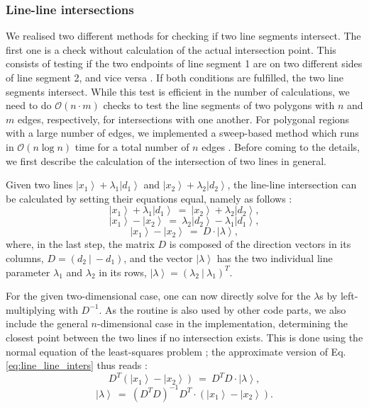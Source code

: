 \subsubsection*{Line-line intersections}
We realised two different methods for checking if two line segments intersect.
The first one is a check without calculation of the actual intersection point. 
This consists of testing if the two endpoints of line segment 1 are on two different sides of line
segment 2, and vice versa \cite{TODO}. If both conditions are fulfilled, the two line segments intersect.
While this test is efficient in the number of calculations, we need to do $\mathcal{O}\left(n \cdot m\right)$ checks
to test the line segments of two polygons with $n$ and $m$ edges, respectively, for intersections with one another.
For polygonal regions with a large number of edges, we implemented a sweep-based method which runs
in $\mathcal{O}\left(n \log n\right)$ time for a total number of $n$ edges \cite{TODO}. 
Before coming to the details, we first describe the calculation of the intersection of two lines in general.

Given two lines $\left|x_1\right> + \lambda_1 \left|d_1\right>$ and $\left|x_2\right> + \lambda_2 \left|d_2\right>$, 
the line-line intersection can be calculated by setting their equations equal, namely as follows \cite{wiki_line_line_intersection}:
\begin{equation}
	\left|x_1\right> + \lambda_1 \left|d_1\right> \ =\ \left|x_2\right> + \lambda_2 \left|d_2\right>,
\end{equation}
\begin{equation}
	\left|x_1\right> - \left|x_2\right> \ =\  \lambda_2 \left|d_2\right> - \lambda_1 \left|d_1\right>,
\end{equation}
\begin{equation}
	\left|x_1\right> - \left|x_2\right> \ =\  D \cdot \left| \lambda \right>,
	\label{eq:line_line_inters}
\end{equation}
where, in the last step, the matrix $D$ is composed of the direction vectors in its columns, $D = \left( d_2 \ |\  -d_1 \right)$, 
and the vector $\left| \lambda \right>$ has the two individual line parameter $\lambda_1$ and $\lambda_2$ in its
rows, $\left| \lambda \right> = \left( \lambda_2 \ |\  \lambda_1 \right)^T$.

For the given two-dimensional case, one can now directly solve for the $\lambda$s by left-multiplying with $D^{-1}$.
As the routine is also used by other code parts, we also include the general $n$-dimensional case in the implementation, 
determining the closest point between the two lines if no intersection exists.
This is done using the normal equation of the least-squares problem \cite[p. 793]{Arens2015}; 
the approximate version of Eq. \ref{eq:line_line_inters} thus reads \cite{wiki_line_line_intersection}: 
\begin{equation}
	D^T \left(\left|x_1\right> - \left|x_2\right>\right) \ =\  D^T D \cdot \left| \lambda \right>,
\end{equation}
\begin{equation}
	\left| \lambda \right> \ =\  \left( D^T D \right)^{-1} D^T \cdot \left( \left|x_1\right> - \left|x_2\right> \right).
\end{equation}

